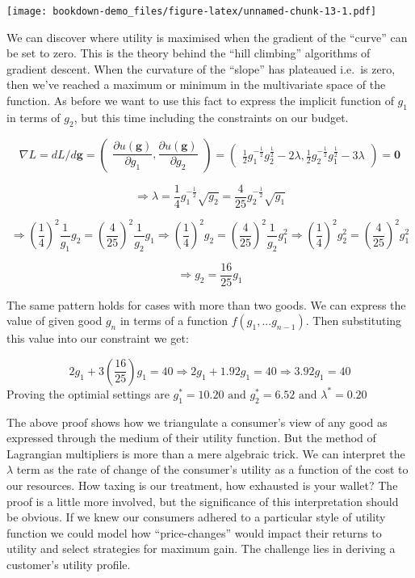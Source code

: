 \documentclass[
]{book}
\theoremstyle{definition}
\theoremstyle{definition}
\theoremstyle{definition}
\theoremstyle{remark}
\begin{document}
\texttt{[image: bookdown-demo\_files/figure-latex/unnamed-chunk-13-1.pdf]}

We can discover where utility is maximised when the gradient of the ``curve'' can be set to zero. This is the theory behind the ``hill climbing'' algorithms of gradient descent. When the curvature of the ``slope'' has plateaued i.e.~is zero, then we've reached a maximum or minimum in the multivariate space of the function. As before we want to use this fact to express the implicit function of \(g_{1}\) in terms of \(g_{2}\), but this time including the constraints on our budget.

\[
\nabla L = dL /  d\mathbf{g} =
    \begin{pmatrix}
       \dfrac{\partial u(\mathbf{g})}{\partial g_1} , \dfrac{\partial u(\mathbf{g})}{\partial g_2}
    \end{pmatrix} = \begin{pmatrix}
    \frac{1}{2}g_{1}^{-\frac{1}{2}}g_{2}^{\frac{1}{2} } - 2\lambda ,
    \frac{1}{2}g_{2}^{-\frac{1}{2}}g_{1}^{\frac{1}{2} } - 3\lambda
    \end{pmatrix} = \mathbf{0}
\]

\[ \Rightarrow \lambda = \frac{1}{4}g_{1}^{-\frac{1}{2}}\sqrt{g_{2}} = \frac{4}{25}g_{2}^{-\frac{1}{2}}\sqrt{g_{1}}\]

\[ \Rightarrow  (\frac{1}{4})^2\frac{1}{g_{1}}g_{2} = (\frac{4}{25})^2\frac{1}{g_{2}}g_{1} \Rightarrow (\frac{1}{4})^2 g_{2} = (\frac{4}{25})^2\frac{1}{g_{2}}g_{1}^2  \Rightarrow (\frac{1}{4})^2g_{2}^{2} = (\frac{4}{25})^2g_{1}^2 \]

\[ \Rightarrow g_{2} = \frac{16}{25}g_{1}\]

The same pattern holds for cases with more than two goods. We can express the value of given good \(g_n\) in terms of a function \(f(g_{1}, ... g_{n-1})\). Then substituting this value into our constraint we get:

\[ 2g_{1} + 3(\frac{16}{25})g_{1} = 40 \Rightarrow 2g_{1} + 1.92g_{1} = 40 \Rightarrow 3.92g_{1} = 40\] Proving the optimial settings are \(g_{1}^{*} = 10.20 \text{ and } g_{2}^{*} = 6.52 \text{ and } \lambda^{*} = 0.20\)

The above proof shows how we triangulate a consumer's view of any good as expressed through the medium of their utility function. But the method of Lagrangian multipliers is more than a mere algebraic trick. We can interpret the \(\lambda\) term as the rate of change of the consumer's utility as a function of the cost to our resources. How taxing is our treatment, how exhausted is your wallet? The proof is a little more involved, but the significance of this interpretation should be obvious. If we knew our consumers adhered to a particular style of utility function we could model how ``price-changes'' would impact their returns to utility and select strategies for maximum gain. The challenge lies in deriving a customer's utility profile.
\end{document}
